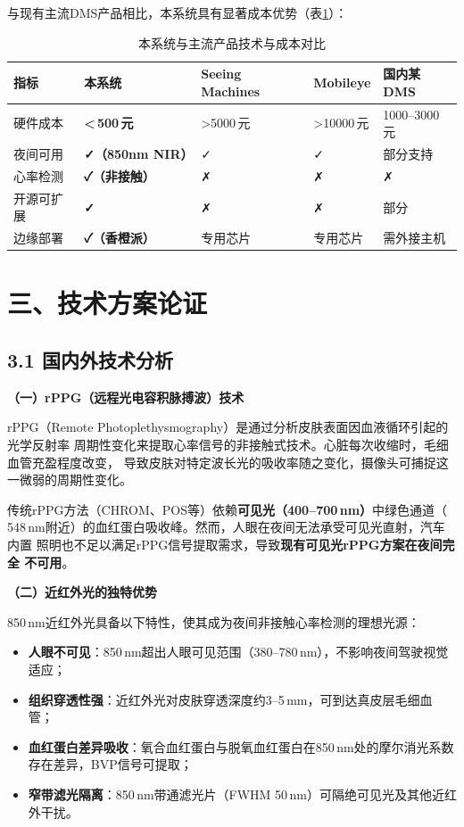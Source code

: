 \documentclass[a4paper,12pt]{article}
\begin{document}
与现有主流DMS产品相比，本系统具有显著成本优势（表\ref{tab:market_compare}）：

\begin{table}[H]
  \centering
  \caption{本系统与主流产品技术与成本对比}
  \label{tab:market_compare}
  \renewcommand{\arraystretch}{1.3}
  \begin{tabular}{|p{2.8cm}|p{2.5cm}|p{2.5cm}|p{2.5cm}|p{3cm}|}
    \hline
    \textbf{指标} & \textbf{本系统} & \textbf{Seeing Machines} & \textbf{Mobileye} & \textbf{国内某DMS}\\
    \hline
    硬件成本 & \textbf{<\,500\,元} & >5000\,元 & >10000\,元 & 1000--3000\,元\\
    \hline
    夜间可用 & \textbf{✓（850nm NIR）} & ✓ & ✓ & 部分支持\\
    \hline
    心率检测 & \textbf{✓（非接触）} & ✗ & ✗ & ✗\\
    \hline
    开源可扩展 & \textbf{✓} & ✗ & ✗ & 部分\\
    \hline
    边缘部署 & \textbf{✓（香橙派）} & 专用芯片 & 专用芯片 & 需外接主机\\
    \hline
  \end{tabular}
\end{table}

\section*{三、技术方案论证}

\subsection*{3.1 国内外技术分析}

\textbf{（一）rPPG（远程光电容积脉搏波）技术}

rPPG（Remote Photoplethysmography）是通过分析皮肤表面因血液循环引起的光学反射率
周期性变化来提取心率信号的非接触式技术。心脏每次收缩时，毛细血管充盈程度改变，
导致皮肤对特定波长光的吸收率随之变化，摄像头可捕捉这一微弱的周期性变化。

传统rPPG方法（CHROM、POS等）依赖\textbf{可见光（400--700\,nm）}中绿色通道（
548\,nm附近）的血红蛋白吸收峰。然而，人眼在夜间无法承受可见光直射，汽车内置
照明也不足以满足rPPG信号提取需求，导致\textbf{现有可见光rPPG方案在夜间完全
不可用}。

\textbf{（二）近红外光的独特优势}

850\,nm近红外光具备以下特性，使其成为夜间非接触心率检测的理想光源：
\begin{itemize}[leftmargin=2em, itemsep=2pt]
  \item \textbf{人眼不可见}：850\,nm超出人眼可见范围（380--780\,nm），不影响夜间驾驶视觉适应；
  \item \textbf{组织穿透性强}：近红外光对皮肤穿透深度约3--5\,mm，可到达真皮层毛细血管；
  \item \textbf{血红蛋白差异吸收}：氧合血红蛋白与脱氧血红蛋白在850\,nm处的摩尔消光系数存在差异，BVP信号可提取；
  \item \textbf{窄带滤光隔离}：850\,nm带通滤光片（FWHM\,\approx\,50\,nm）可隔绝可见光及其他近红外干扰。
\end{itemize}
\end{document}
